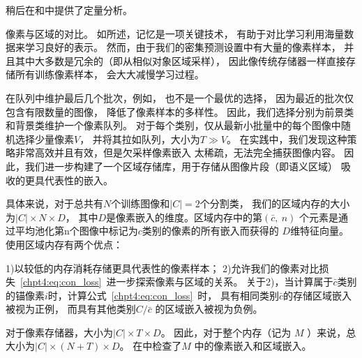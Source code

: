 \par
% 
% 


稍后在\todo 和\todo 中提供了定量分析。


像素与区域的对比。
如\todo 所述，记忆是一项关键技术，
有助于对比学习利用海量数据来学习良好的表示。
然而，由于我们的密集预测设置中有大量的像素样本，
并且其中大多数是冗余的（即从相似对象区域采样），
因此像传统存储器一样直接存储所有训练像素样本\todo ，
会大大减慢学习过程。
\par
% 
% 
% 
% 
在队列中维护最后几个批次，例如\todo，
也不是一个最优的选择，
因为最近的批次仅包含有限数量的图像，
降低了像素样本的多样性。
因此，我们选择分别为前景类和背景类维护一个像素队列。
对于每个类别，仅从最新小批量中的每个图像中随机选择少量像素$V$，
并将其拉如队列，大小为$T \gg  V$。
% 
% 
% 
% 
在实践中，我们发现这种策略非常高效并且有效，但是欠采样像素嵌入
太稀疏，无法完全捕获图像内容。
因此，我们进一步构建了一个区域存储库，用于存储从图像片段（即语义区域）
吸收的更具代表性的嵌入。


具体来说，对于总共有$N$个训练图像和$|C|=2$个分割类，
我们的区域内存的大小为$|C|\times N \times D$，
其中$D$是像素嵌入的维度。区域内存中的第$(\bar{c},~n)$
个元素是通过平均池化第n个图像中标记为$c$类别的像素的所有嵌入而获得的
$D$维特征向量。
使用区域内存有两个优点：

1)以较低的内存消耗存储更具代表性的像素样本；
2)允许我们的像素对比损失~\ref{chpt4:eq:con_loss}~进一步探索像素与区域的关系。
关于2)，当计算属于$\bar{c}$类别的锚像素$i$时，计算公式~\ref{chpt4:eq:con_loss}~时，
具有相同类别$\bar{c}$的存储区域嵌入被视为正例，
而具有其他类别$C/ \bar{c}$ 的区域嵌入被视为负例。
% 
% 
% 
% 
\par
对于像素存储器，大小为$|C|\times T \times D$。
因此，对于整个内存（记为 $M$ ）来说，总大小为$|C| \times (N+T) \times D$。
在\todo 中检查了$M$ 中的像素嵌入和区域嵌入。




\todo 
















%
% 

%
%
%
\par
% 
% 
% 
% 

\par

\par
% 
% 
% 
% 


